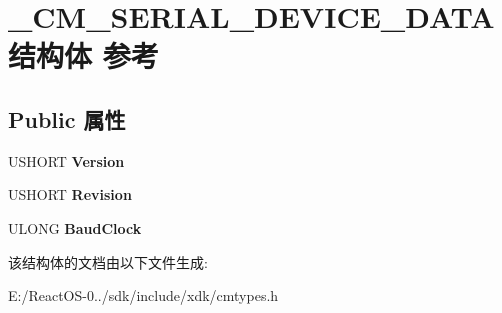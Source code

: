 \hypertarget{struct___c_m___s_e_r_i_a_l___d_e_v_i_c_e___d_a_t_a}{}\section{\+\_\+\+C\+M\+\_\+\+S\+E\+R\+I\+A\+L\+\_\+\+D\+E\+V\+I\+C\+E\+\_\+\+D\+A\+T\+A结构体 参考}
\label{struct___c_m___s_e_r_i_a_l___d_e_v_i_c_e___d_a_t_a}
\subsection*{Public 属性}
\begin{DoxyCompactItemize}
\item 
\mbox{\label{struct___c_m___s_e_r_i_a_l___d_e_v_i_c_e___d_a_t_a_a374d2450d3c775f8b41d77031c9eba81}} 
U\+S\+H\+O\+RT {\bfseries Version}
\item 
\mbox{\label{struct___c_m___s_e_r_i_a_l___d_e_v_i_c_e___d_a_t_a_a76de2a58a334bb612f691d4d570ec7eb}} 
U\+S\+H\+O\+RT {\bfseries Revision}
\item 
\mbox{\label{struct___c_m___s_e_r_i_a_l___d_e_v_i_c_e___d_a_t_a_a82c7fe2c2513fbb7e720a87bfd9f5442}} 
U\+L\+O\+NG {\bfseries Baud\+Clock}
\end{DoxyCompactItemize}


该结构体的文档由以下文件生成\+:\begin{DoxyCompactItemize}
\item 
E\+:/\+React\+O\+S-\/0../sdk/include/xdk/cmtypes.\+h\end{DoxyCompactItemize}
